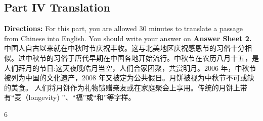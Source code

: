 \documentclass[UTF8,11pt]{ctexart}
\begin{document}
\subsection*{\textbf{Part IV} \textbf{Translation}}


\textbf{Directions:} For this part, you are allowed 30 minutes to translate a passage from Chinese into English. You should write your answer on\textbf{ Answer Sheet 2.} 中国人自古以来就在中秋时节庆祝丰收。这与北美地区庆祝感恩节的习俗十分相似。过中秋节的习俗于唐代早期在中国各地开始流行。中秋节在农历八月十五，是人们拜月的节日:这天夜晚皓月当空，人们合家团聚，共赏明月。2006 年，中秋节被列为中国的文化遗产，2008 年又被定为公共假日。月饼被视为中秋节不可或缺的美食。 人们将月饼作为礼物馈赠亲友或在家庭聚会上享用。传统的月饼上带有“麦（longevity) ”、“福”或“和”等字样。


6
\end{document}
